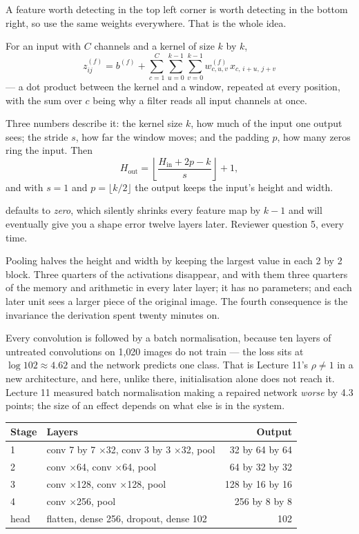 \documentclass[11pt,a4paper]{article}
\begin{document}
A feature worth detecting in the top left corner is worth detecting in the
bottom right, so use the same weights everywhere. That is the whole idea.

For an input with $C$ channels and a kernel of size $k$ by $k$,
\[ z^{(f)}_{ij} = b^{(f)} + \sum_{c=1}^{C}\sum_{u=0}^{k-1}\sum_{v=0}^{k-1}
   w^{(f)}_{c,u,v}\,x_{c,\,i+u,\,j+v} \]
--- a dot product between the kernel and a window, repeated at every position,
with the sum over $c$ being why a filter reads all input channels at once.

Three numbers describe it: the kernel size $k$, how much of the input one
output sees; the stride $s$, how far the window moves; and the padding $p$, how
many zeros ring the input. Then
\[ H_{\text{out}} = \left\lfloor\frac{H_{\text{in}} + 2p - k}{s}\right\rfloor
   + 1, \]
and with $s = 1$ and $p = \lfloor k/2\rfloor$ the output keeps the input's
height and width.

\begin{failbox}[title={Failure condition --- the default nobody asked for}]
 defaults to \emph{zero}, which silently shrinks every feature
map by $k-1$ and will eventually give you a shape error twelve layers later.
Reviewer question 5, every time.
\end{failbox}

Pooling halves the height and width by keeping the largest value in each 2 by 2
block. Three quarters of the activations disappear, and with them three
quarters of the memory and arithmetic in every later layer; it has no
parameters; and each later unit sees a larger piece of the original image. The
fourth consequence is the invariance the derivation spent twenty minutes on.

Every convolution is followed by a batch normalisation, because ten layers of
untreated convolutions on 1{,}020 images do not train --- the loss sits at
$\log 102 \approx 4.62$ and the network predicts one class. That is Lecture
11's $\rho \ne 1$ in a new architecture, and here, unlike there, initialisation
alone does not reach it. Lecture 11 measured batch normalisation making a
repaired network \emph{worse} by 4.3 points; the size of an effect depends on
what else is in the system.

\begin{center}
\small
\begin{tabular}{llr}
\toprule
\textbf{Stage} & \textbf{Layers} & \textbf{Output} \\
\midrule
1 & conv 7 by 7 $\times$32, conv 3 by 3 $\times$32, pool & 32 by 64 by 64 \\
2 & conv $\times$64, conv $\times$64, pool & 64 by 32 by 32 \\
3 & conv $\times$128, conv $\times$128, pool & 128 by 16 by 16 \\
4 & conv $\times$256, pool & 256 by 8 by 8 \\
head & flatten, dense 256, dropout, dense 102 & 102 \\
\bottomrule
\end{tabular}
\end{center}
\end{document}
